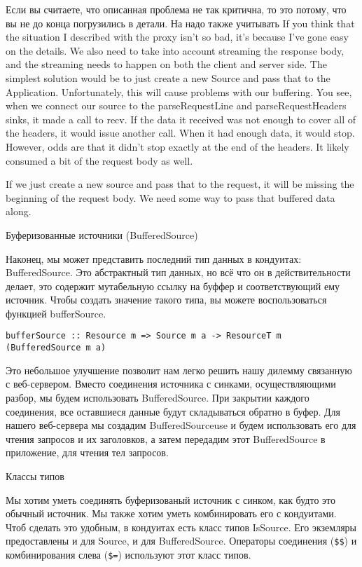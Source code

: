 Если вы считаете, что описанная проблема не так критична, то это потому, что вы не до конца погрузились в детали. На надо также учитывать
If you think that the situation I described with the proxy isn't so bad, it's because I've
gone easy on the details. We also need to take into account streaming the response body,
and the
streaming needs to happen on both the client and server side.
The simplest solution would be to just create a new Source and pass that to
the Application. Unfortunately, this will cause problems with our buffering. You
see, when we connect our source to the parseRequestLine and
parseRequestHeaders sinks, it made a call to recv. If the data
it received was not enough to cover all of the headers, it would issue another call. When
it had
enough data, it would stop. However, odds are that it didn't stop exactly at the end of
the headers. It likely consumed a bit of the request body as well.

If we just create a new source and pass that to the request, it will be missing the
beginning of the request body. We need some way to pass that buffered data along.

Буферизованные источники (BufferedSource)

Наконец, мы может представить последний тип данных в кондуитах: BufferedSource. Это абстрактный тип данных, но всё что он в действительности делает, это содержит мутабельную ссылку на буффер и соответствующий ему источник. Чтобы создать значение такого типа, вы можете воспользоваться функцией bufferSource.
\begin{verbatim}
bufferSource :: Resource m => Source m a -> ResourceT m (BufferedSource m a)
\end{verbatim}
Это небольшое улучшение позволит нам легко решить нашу дилемму связанную с веб-сервером.
Вместо соединения источника с синками, осуществляющими разбор, мы будем использовать 
BufferedSource. При закрытии каждого соединения, все оставшиеся данные будут складываться
обратно в буфер. Для нашего веб-сервера мы создадим BufferedSourceuse и будем использовать 
его для чтения запросов и их заголовков, а затем передадим этот BufferedSource в приложение, для чтения тел запросов.

Классы типов

Мы хотим уметь соединять буферизованый источник с синком, как будто это обычный источник.
Мы также хотим уметь комбинировать его с кондуитами. Чтоб сделать это удобным, в кондуитах
есть класс типов IsSource. Его экземляры предоставлены и для Source, и для BufferedSource. 
Операторы соединения (\verb#$$#) и комбинирования слева (\verb#$=#) используют этот класс типов.

